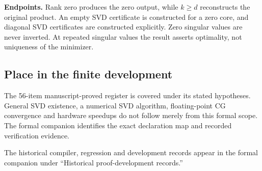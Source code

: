 \textbf{Endpoints.} Rank zero produces the zero output, while $k\geq d$ reconstructs the original product. An empty SVD certificate is constructed for a zero core, and diagonal SVD certificates are constructed explicitly. Zero singular values are never inverted. At repeated singular values the result asserts optimality, not uniqueness of the minimizer.



\subsection{Place in the finite development}\label{supp6:subsection:006}
The 56-item manuscript-proved register is covered under its stated hypotheses. General SVD existence, a numerical SVD algorithm, floating-point CG convergence and hardware speedups do not follow merely from this formal scope. The formal companion identifies the exact declaration map and recorded verification evidence.

The historical compiler, regression and development records appear in the formal companion under ``Historical proof-development records.''
